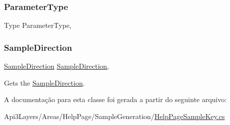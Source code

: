 \subsubsection{\texorpdfstring{Parameter\+Type}{ParameterType}}
{\footnotesize\ttfamily Type Parameter\+Type\hspace{0.3cm}{\ttfamily [get]}, {}}

\mbox{\label{classApi3Layers_1_1Areas_1_1HelpPage_1_1HelpPageSampleKey_a7f001c7cd8d8d35bc4613b02ca9d639c}} 
\subsubsection{\texorpdfstring{Sample\+Direction}{SampleDirection}}
{\footnotesize\ttfamily \hyperlink{namespaceApi3Layers_1_1Areas_1_1HelpPage_abad9f6d2b059d72558bf70415efc32b5}{Sample\+Direction} \hyperlink{namespaceApi3Layers_1_1Areas_1_1HelpPage_abad9f6d2b059d72558bf70415efc32b5}{Sample\+Direction}\hspace{0.3cm}{\ttfamily [get]}, {}}



Gets the \hyperlink{classApi3Layers_1_1Areas_1_1HelpPage_1_1HelpPageSampleKey_a7f001c7cd8d8d35bc4613b02ca9d639c}{Sample\+Direction}. 



A documentação para esta classe foi gerada a partir do seguinte arquivo\+:\begin{DoxyCompactItemize}
\item 
Api3\+Layers/\+Areas/\+Help\+Page/\+Sample\+Generation/\hyperlink{HelpPageSampleKey_8cs}{Help\+Page\+Sample\+Key.\+cs}\end{DoxyCompactItemize}
